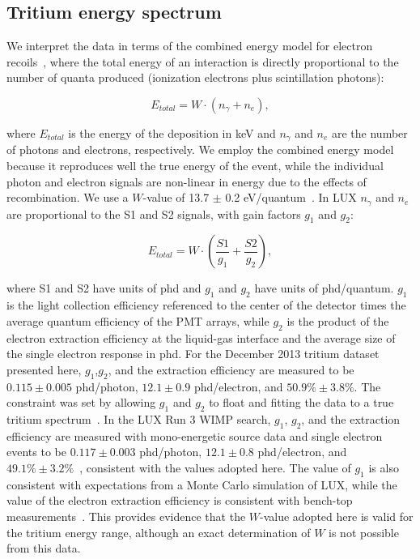 \subsection{Tritium energy spectrum}

We interpret the data in terms of the combined energy model for electron recoils~\cite{Platzman}, where the total energy of an interaction is directly proportional to the number of quanta produced (ionization electrons plus scintillation photons):

\begin{equation}
E_{total} = W \cdot (n_{\gamma} + n_e ),
\label{platzman_eq}
\end{equation}

\noindent
where $E_{total}$ is the energy of the deposition in keV and  $n_\gamma$ and $n_e$ are the number of photons and electrons, respectively. We employ the combined energy model because it reproduces well the true energy of the event, while the individual photon and electron signals are non-linear in energy due to the effects of recombination. We use a $W$-value of 13.7 $\pm$ 0.2 eV/quantum~\cite{Dahl_Thesis}. In LUX $n_{\gamma}$ and $n_e$ are proportional to the S1 and S2 signals, with gain factors $g_1$ and $g_2$: 

\begin{equation}
E_{total} = W \cdot \left(\frac{S1}{g_1} + \frac{S2}{g_2} \right),
\label{energy_eq}
\end{equation}

\noindent
where S1 and S2 have units of phd and $g_1$ and $g_2$ have units of phd/quantum. $g_1$ is the light collection efficiency referenced to the center of the detector times the average quantum efficiency of the PMT arrays, while $g_2$ is the product of the electron extraction efficiency at the liquid-gas interface and the average size of the single electron response in phd. For the December 2013 tritium dataset presented here, $g_1$,$g_2$, and the extraction efficiency are measured to be $0.115 \pm 0.005$ phd/photon, $12.1 \pm 0.9$ phd/electron, and $50.9\% \pm 3.8\%$. The constraint was set by allowing $g_1$ and $g_2$ to float and fitting the data to a true tritium spectrum~\cite{Drexlin:2013lha}.  In the LUX Run 3 WIMP search, $g_1$, $g_2$, and the extraction efficiency are measured with mono-energetic source data and single electron events to be $0.117 \pm 0.003$ phd/photon, $12.1 \pm 0.8$ phd/electron, and $49.1\% \pm 3.2\%$~\cite{lux-reanalysis, lux-prd}, consistent with the values adopted here. The value of $g_1$ is also consistent with expectations from a Monte Carlo simulation of LUX, while the value of the electron extraction efficiency is consistent with bench-top measurements~\cite{gushchin:1979,gushchin:1982}. This provides evidence that the $W$-value adopted here is valid for the tritium energy range, although an exact determination of $W$ is not possible from this data. 

